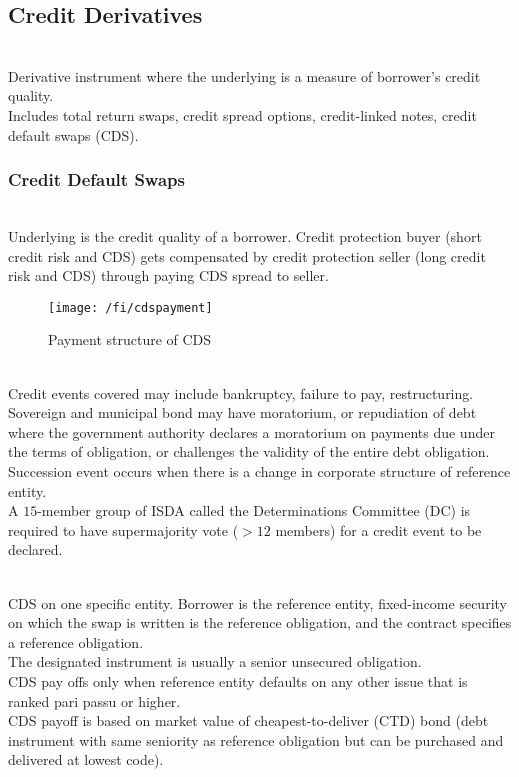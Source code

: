 \subsection{Credit Derivatives}

\begin{definition} \\
Derivative instrument where the underlying is a measure of borrower's credit quality.\\
Includes total return swaps, credit spread options, credit-linked notes, credit default swaps (CDS).
\end{definition}

\subsubsection{Credit Default Swaps}

\begin{definition} \\
Underlying is the credit quality of a borrower. Credit protection buyer (short credit risk and CDS) gets compensated by credit protection seller (long credit risk and CDS) through paying CDS spread to seller.
\end{definition}

\begin{figure}[H]
\centering
\texttt{[image: /fi/cdspayment]}
\caption{Payment structure of CDS}
\end{figure}

\begin{remark} \\
Credit events covered may include bankruptcy, failure to pay, restructuring.\\
Sovereign and municipal bond may have moratorium, or repudiation of debt where the government authority declares a moratorium on payments due under the terms of obligation, or challenges the validity of the entire debt obligation. Succession event occurs when there is a change in corporate structure of reference entity.\\
A $15$-member group of ISDA called the Determinations Committee (DC) is required to have supermajority vote ($>12$ members) for a credit event to be declared.
\end{remark}

\begin{definition} \\
CDS on one specific entity. Borrower is the reference entity, fixed-income security 	on which the swap is written is the reference obligation, and the contract specifies a reference obligation.\\
The designated instrument is usually a senior unsecured obligation.\\
CDS pay offs only when reference entity defaults on any other issue that is ranked pari passu or higher.\\
CDS payoff is based on market value of cheapest-to-deliver (CTD) bond (debt instrument with same seniority as reference obligation but can be purchased and delivered at lowest code).
\end{definition}

